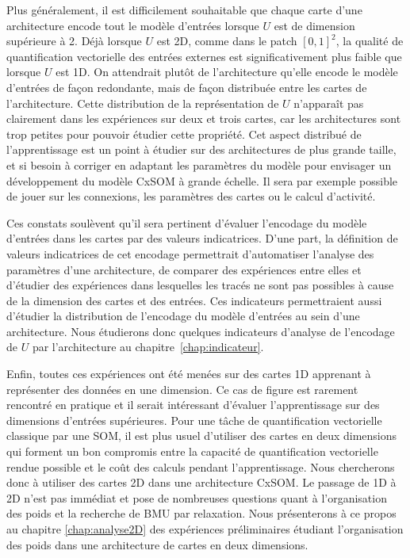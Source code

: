 \documentclass[../main]{subfiles}
\begin{document}
Plus généralement, il est difficilement souhaitable que chaque carte d'une architecture encode tout le modèle d'entrées lorsque $U$ est de dimension supérieure à 2. Déjà lorsque $U$ est 2D, comme dans le patch $[0,1]^2$, la qualité de quantification vectorielle des entrées externes est significativement plus faible que lorsque $U$ est 1D.
On attendrait plutôt de l'architecture qu'elle encode le modèle d'entrées de façon redondante, mais de façon distribuée entre les cartes de l'architecture.
Cette distribution de la représentation de $U$ n'apparaît pas clairement dans les expériences sur deux et trois cartes, car les architectures sont trop petites pour pouvoir étudier cette propriété. Cet aspect distribué de l'apprentissage est un point à étudier sur des architectures de plus grande taille, et si besoin à corriger en adaptant les paramètres du modèle pour envisager un développement du modèle CxSOM à grande échelle. 
Il sera par exemple possible de jouer sur les connexions, les paramètres des cartes ou le calcul d'activité.

Ces constats soulèvent qu'il sera pertinent d'évaluer l'encodage du modèle d'entrées dans les cartes par des valeurs indicatrices.
D'une part, la définition de valeurs indicatrices de cet encodage permettrait d'automatiser l'analyse des paramètres d'une architecture, de comparer des expériences entre elles et d'étudier des expériences dans lesquelles les tracés ne sont pas possibles à cause de la dimension des cartes et des entrées.
Ces indicateurs permettraient aussi d'étudier la distribution de l'encodage du modèle d'entrées au sein d'une architecture.
Nous étudierons donc quelques indicateurs d'analyse de l'encodage de $U$ par l'architecture au chapitre~\ref{chap:indicateur}.

Enfin, toutes ces expériences ont été menées sur des cartes 1D apprenant à représenter des données en une dimension. Ce cas de figure est rarement rencontré en pratique et il serait intéressant d'évaluer l'apprentissage sur des dimensions d'entrées supérieures. Pour une tâche de quantification vectorielle classique par une SOM, il est plus usuel d'utiliser des cartes en deux dimensions qui forment un bon compromis entre la capacité de quantification vectorielle rendue possible et le coût des calculs pendant l'apprentissage. Nous chercherons donc à utiliser des cartes 2D dans une architecture CxSOM. Le passage de 1D à 2D n'est pas immédiat et pose de nombreuses questions quant à l'organisation des poids et la recherche de BMU par relaxation. 
Nous présenterons à ce propos au chapitre \ref{chap:analyse2D} des expériences préliminaires étudiant l'organisation des poids dans une architecture de cartes en deux dimensions.

\ifSubfilesClassLoaded{
    \printbibliography
}{}
\end{document}
